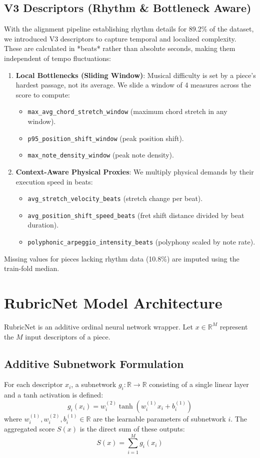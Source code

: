 \subsection{V3 Descriptors (Rhythm \& Bottleneck Aware)}
With the alignment pipeline establishing rhythm details for 89.2\% of the dataset, we introduced V3 descriptors to capture temporal and localized complexity. These are calculated in *beats* rather than absolute seconds, making them independent of tempo fluctuations:
\begin{enumerate}
    \item \textbf{Local Bottlenecks (Sliding Window)}: Musical difficulty is set by a piece's hardest passage, not its average. We slide a window of 4 measures across the score to compute:
    \begin{itemize}
        \item \texttt{max\_avg\_chord\_stretch\_window} (maximum chord stretch in any window).
        \item \texttt{p95\_position\_shift\_window} (peak position shift).
        \item \texttt{max\_note\_density\_window} (peak note density).
    \end{itemize}
    \item \textbf{Context-Aware Physical Proxies}: We multiply physical demands by their execution speed in beats:
    \begin{itemize}
        \item \texttt{avg\_stretch\_velocity\_beats} (stretch change per beat).
        \item \texttt{avg\_position\_shift\_speed\_beats} (fret shift distance divided by beat duration).
        \item \texttt{polyphonic\_arpeggio\_intensity\_beats} (polyphony scaled by note rate).
    \end{itemize}
\end{enumerate}
Missing values for pieces lacking rhythm data (10.8\%) are imputed using the train-fold median.

\section{RubricNet Model Architecture}
RubricNet is an additive ordinal neural network wrapper. Let $x \in \mathbb{R}^M$ represent the $M$ input descriptors of a piece.

\subsection{Additive Subnetwork Formulation}
For each descriptor $x_i$, a subnetwork $g_i: \mathbb{R} \to \mathbb{R}$ consisting of a single linear layer and a tanh activation is defined:
\begin{equation}
    g_i(x_i) = w_i^{(2)} \tanh(w_i^{(1)} x_i + b_i^{(1)})
\end{equation}
where $w_i^{(1)}, w_i^{(2)}, b_i^{(1)} \in \mathbb{R}$ are the learnable parameters of subnetwork $i$. The aggregated score $S(x)$ is the direct sum of these outputs:
\begin{equation}
    S(x) = \sum_{i=1}^{M} g_i(x_i)
\end{equation}

